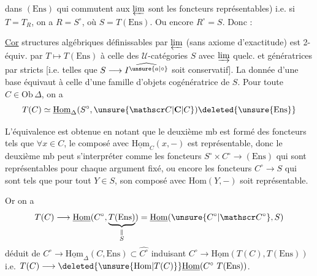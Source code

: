 dans $(\mathrm{Ens})$ qui commutent aux $\varprojlim$ sont les foncteurs représentables) i.e. si $T=T_R$, on a $R=S^\circ$, où $S=T(\mathrm{Ens})$.   Ou encore $R^\circ=S$. Donc :

\uline{Cor}   structures algébriques définissables par $\varprojlim$ (sans axiome d'exactitude)  est 2-équiv. par $T\longmapsto T(\mathrm{Ens})$ à celle des $\mathcal U$-catégories $S$ avec $\varinjlim$ quelc. et    génératrices par  stricts [i.e. telles que $S\longrightarrow\widehat{I^{\unsure{a|\circ}}}$ soit conservatif]. La donnée d'une base  équivaut à celle d'une famille d'objets cogénératrice de $S$. Pour toute $C\in\mathrm{Ob}\,\Delta$, on a
\[
T(C)\simeq\underline{\mathrm{Hom}}_{\Delta}(S^\circ,\unsure{\mathscr C|\mathbf C|C})\deleted{\unsure{\mathrm{Ens}}}
\]

L'équivalence est obtenue en notant que le deuxième mb est formé des foncteurs tels que $\forall x\in C$, le composé avec $\underline{\mathrm{Hom}}_{C}(x,-)$ est représentable, donc le deuxième mb  peut s'interpréter comme les foncteurs $S^\circ\times C^\circ\longrightarrow(\mathrm{Ens})$ qui sont représentables pour chaque argument fixé, ou encore les foncteurs $C^\circ\longrightarrow S$ qui sont tels que pour tout $Y\in S$, son composé avec $\mathrm{Hom}(Y,-)$ soit représentable.

Or on a
\[
T(C)\longrightarrow\underline{\mathrm{Hom}}(C^\circ,\underbrace{T(\mathrm{Ens})}_{\substack{\Vert\\S}})=\underline{\mathrm{Hom}}(\unsure{C^\circ|\mathscr C^\circ},S)
\]
déduit de $C^\circ\longrightarrow\underline{\mathrm{Hom}}_{\Delta}(C,\mathrm{Ens})\subset\widehat{C^\circ}$ induisant $C^\circ\longrightarrow\underline{\mathrm{Hom}}(T(C),T(\mathrm{Ens}))$ i.e. $T(C)\longrightarrow\deleted{\unsure{\mathrm{Hom}|T(C)}}\underline{\mathrm{Hom}}(C^\circ\ T(\mathrm{Ens}))$.


